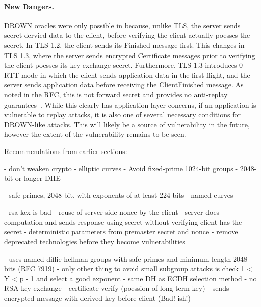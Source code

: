 \paragraph{New Dangers.}
DROWN oracles were only possible in \ssltwo because, unlike TLS, the server
sends secret-dervied data to the client, before verifying the client actually
poesses the secret. In TLS 1.2, the client sends its \textsf{Finished}
message first. This changes in TLS 1.3, where the server sends encrypted
\textsf{Certificate} messages prior to verifying the client poesses its key
exchange secret. Furthermore, TLS 1.3 introduces 0-RTT mode in which the
client sends application data in the first flight, and the server sends
application data before receiving the \textsf{ClientFinished} message. As
noted in the RFC, this is not forward secret and provides no anti-replay
guarantees~\cite{rfc8446}. While this clearly has application layer concerns,
if an application is vulnerable to replay attacks, it is also one of several
necessary conditions for DROWN-like attacks. This will likely be a source of
vulnerability in the future, however the extent of the vulnerability remains
to be seen.

Recommendations from earlier sections:

- don't weaken crypto
- elliptic curves
- Avoid fixed-prime 1024-bit groups
- 2048-bit or longer DHE

- safe primes, 2048-bit, with exponents of at least 224 bits
- named curves

- rsa kex is bad
- reuse of server-side nonce by the client
- server does computation and sends response using secret without verifying client has the secret
- deterministic parameters from premaster secret and nonce
- remove deprecated technologies before they become vulnerabilities

- uses named diffie hellman groups with safe primes and minimum length 2048-bits (RFC 7919)
- only other thing to avoid small subgroup attacks is check 1 < Y < p - 1 and select a good exponent
- same DH as ECDH selection method
- no RSA key exchange
- certificate verify (poession of long term key)
- sends encrypted message with derived key before client (Bad!-ish!)

\fi

%
%

